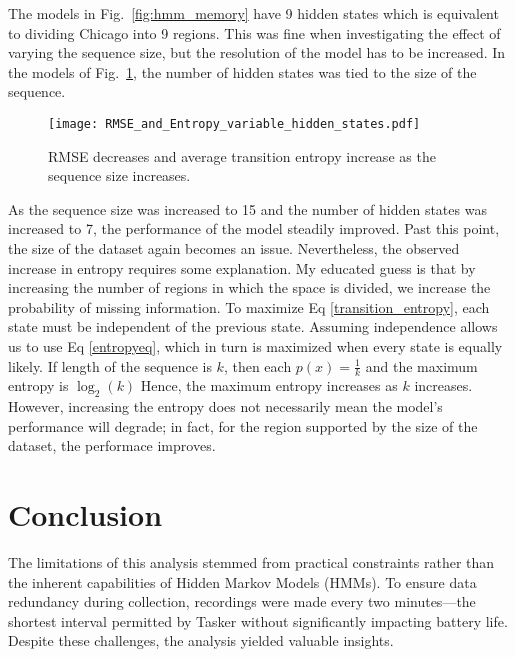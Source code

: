\documentclass[11pt]{amsart}
\begin{document}
The models in Fig.~\ref{fig:hmm_memory} have 9 hidden states which is equivalent to dividing Chicago into 9 regions.
This was fine when investigating the effect of varying the sequence size, but the resolution of the model has to be increased.
In the models of Fig.~\ref{fig:hmm_hidstate}, the number of hidden states was tied to the size of the sequence.

\begin{figure}[h!]
    \centering
    \texttt{[image: RMSE\_and\_Entropy\_variable\_hidden\_states.pdf]} %
    \caption{
    RMSE decreases and average transition entropy increase as the sequence size increases.}
    \label{fig:hmm_hidstate}
\end{figure}
As the sequence size was increased to 15 and the number of hidden states was increased to 7, the performance of the model steadily improved.
Past this point, the size of the dataset again becomes an issue.
Nevertheless, the observed increase in entropy requires some explanation.
My educated guess is that by increasing the number of regions in which the space is divided, we increase the probability of missing information.
To maximize Eq \ref{transition_entropy}, each state must be independent of the previous state.
Assuming independence allows us to use Eq \ref{entropyeq}, which in turn is maximized when every state is equally likely.
If length of the sequence is $k$, then each $p( x ) = \frac 1 k$ and the maximum entropy is $\log_2( k )$
Hence, the maximum entropy increases as $k$ increases.
However, increasing the entropy does not necessarily mean the model's performance will degrade; in fact, for the region supported by the size of the dataset, the performace improves.
\section{Conclusion}

The limitations of this analysis stemmed from practical constraints rather than the inherent capabilities of Hidden Markov Models (HMMs).
To ensure data redundancy during collection, recordings were made every two minutes---the shortest interval permitted by Tasker without significantly impacting battery life.
Despite these challenges, the analysis yielded valuable insights.
\end{document}
